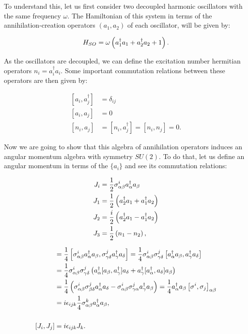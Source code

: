 To understand this, let us first consider two decoupled harmonic oscillators with the same frequency $\omega$. The Hamiltonian of this system in terms of the annihilation-creation operators $(a_1,a_2)$ of each oscillator, will be given by:

\begin{equation*}
H_{SO} = \omega\left( a_1^\dagger a_1 + a_2^\dagger a_2 + 1 \right).
\end{equation*}

As the oscillators are decoupled, we can define the excitation number hermitian operators $n_i = a_i^\dagger a_i$. Some important commutation relations between these operators are then given by:

\begin{align*}
\left[ a_i,a_j^\dagger\right] &= \delta_{ij}\\
\left[ a_i,a_j\right] &= 0\\
\left[ n_i, a_j \right] &= \left[ n_i, a_j^\dagger \right] = \left[ n_i, n_j \right] =0.
\end{align*}
 
Now we are going to show that this algebra of annihilation operators induces an angular momentum algebra with symmetry $SU(2)$. To do that, let us define an angular momentum in terms of the $\{a_i\}$ and see its commutation relations:

\begin{equation}
\begin{aligned}
J_i &= \frac{1}{2}\sigma^i_{\alpha\beta}a^\dagger_\alpha a_\beta \\
J_1 &= \frac{1}{2} \left( a_2^\dagger a_1 + a_1^\dagger a_2 \right)\\
J_2 &= \frac{i}{2} \left( a_2^\dagger a_1 - a_1^\dagger a_2 \right)\\
J_3 &= \frac{1}{2} \left( n_1-n_2 \right),
\end{aligned}
\label{eq:schwingerAM}
\end{equation}

\begin{align*}
[J_i,J_j] &= \frac{1}{4}\left[ \sigma^i_{\alpha\beta}a^\dagger_\alpha a_\beta,\sigma^j_{\gamma\delta}a^\dagger_\gamma a_\delta \right] = \frac{1}{4}\sigma^i_{\alpha\beta}\sigma^j_{\gamma\delta}\left[ a^\dagger_\alpha a_\beta,a^\dagger_\gamma a_\delta \right]\\
&= \frac{1}{4}\sigma^i_{\alpha\beta}\sigma^j_{\gamma\delta}\roundP{a^\dagger_\alpha [a_\beta,a^\dagger_\gamma ]a_\delta +  a^\dagger_\gamma[a^\dagger_\alpha, a_\delta]a_\beta }\\
&= \frac{1}{4}\roundP{\sigma^i_{\alpha\beta}\sigma^j_{\beta\delta}a^\dagger_\alpha a_\delta - \sigma^i_{\alpha\beta}\sigma^j_{\gamma\alpha}a^\dagger_\gamma a_\beta } = \frac{1}{4}a^\dagger_\alpha a_\beta \left[ \sigma^i,\sigma_j \right]_{\alpha\beta}\\
&= i\epsilon_{ijk} \frac{1}{4} \sigma^k_{\alpha\beta}a^\dagger_\alpha a_\beta, \\
\\
[J_i,J_j] &= i\epsilon_{ijk}J_k.
\end{align*}

